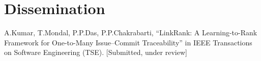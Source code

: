 \section{Dissemination}

A.Kumar, T.Mondal, P.P.Das, P.P.Chakrabarti, “LinkRank: A Learning-to-Rank Framework for One-to-Many Issue–Commit Traceability” in IEEE Transactions on Software Engineering (TSE). [Submitted, under review]
